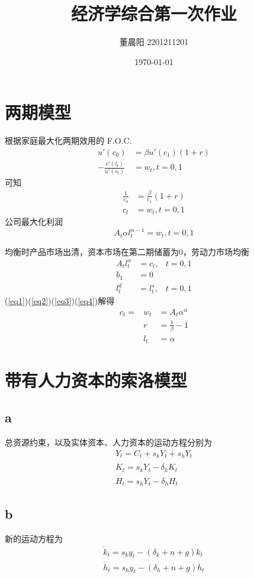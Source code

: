 \documentclass[a4paper,12pt]{ctexart}
\title{经济学综合第一次作业}
\author{董晨阳 2201211201}
\date{\today}
\begin{document}
\maketitle
\section{两期模型}
根据家庭最大化两期效用的 F.O.C.
\begin{eqnarray*}
    u'(c_0)&=\beta u'(c_1)(1+r)\\
    -\frac{v'(l_t)}{u'(c_t)}&=w_t, t=0,1
\end{eqnarray*}
可知
\begin{eqnarray}
    \frac{1}{c_0}&= \displaystyle\frac{\beta}{c_1} (1+r) \label{eq1}\\
    c_t&=w_t, t=0,1\label{eq2}
\end{eqnarray}
公司最大化利润
\begin{equation}
    A_t \alpha l_t^{\alpha-1}=w_t, t=0,1\label{eq3}
\end{equation}

均衡时产品市场出清，资本市场在第二期储蓄为0，劳动力市场均衡
\begin{eqnarray}
    A_tl_t^{\alpha}&=c_t,&t=0,1\label{eq4}\\
    b_1&=0&\nonumber\\
    l_t^d&=l_t^s,&t=0,1\nonumber
\end{eqnarray}
(\ref{eq1})(\ref{eq2})(\ref{eq3})(\ref{eq4})解得
\begin{eqnarray*}
    c_t= &w_t&=A_t\alpha^\alpha\\
    &r &=\frac{1}{\beta}-1\\
    &l_t &=\alpha
\end{eqnarray*}
\section{带有人力资本的索洛模型}
\subsection*{a}
总资源约束，以及实体资本、人力资本的运动方程分别为
\begin{eqnarray*}
    Y_t=C_t+s_kY_t+s_hY_t\\
    \dot{K}_t=s_kY_t-\delta_kK_t\\
    \dot{H}_t=s_hY_t-\delta_hH_t
\end{eqnarray*}

\subsection*{b}
新的运动方程为
\begin{eqnarray*}
    \dot{k}_t=s_ky_t-(\delta_k+n+g)k_t\\
    \dot{h}_t=s_hy_t-(\delta_h+n+g)h_t
\end{eqnarray*}
\end{document}
